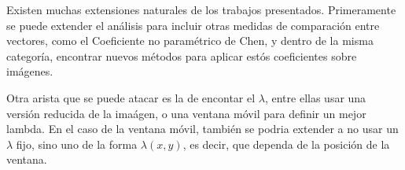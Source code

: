     Existen muchas extensiones naturales de los trabajos presentados. Primeramente se puede extender el an\'alisis para incluir otras medidas de comparaci\'on entre vectores, como el Coeficiente no paramétrico de Chen, y dentro de la misma categor\'ia, encontrar nuevos m\'etodos para aplicar est\'os coeficientes sobre im\'agenes. 

    Otra arista que se puede atacar es la de encontar el $\lambda$, entre ellas usar una versi\'on reducida de la ima\'agen, o una ventana m\'ovil para definir un mejor lambda. En el caso de la ventana m\'ovil, tambi\'en se podria extender a no usar un $\lambda$ fijo, sino uno de la forma $\lambda(x,y)$, es decir, que dependa de la posici\'on de la ventana. 

